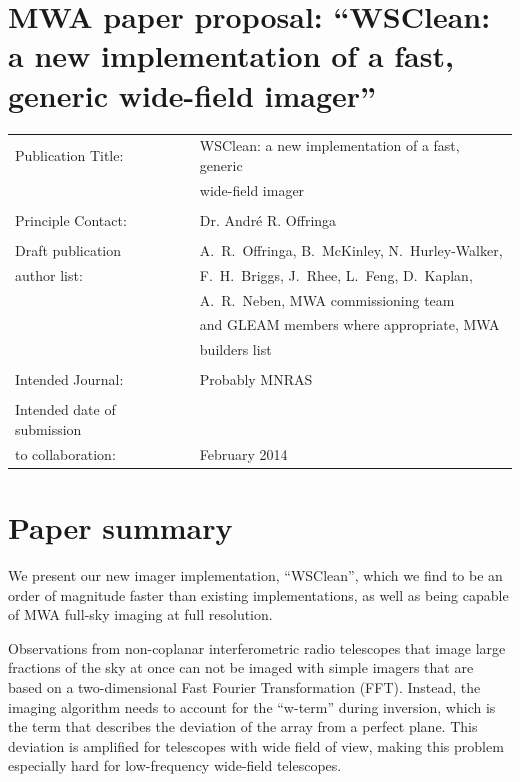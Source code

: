 \documentclass[a4paper,10pt]{article}
\begin{document}
\label{firstpage}
\section*{MWA paper proposal: ``WSClean: a new implementation of a fast, generic wide-field imager''}
\begin{tabular}{ll}
Publication Title: & WSClean: a new implementation of a fast, generic \\
                   & wide-field imager\\
                   & \\
Principle Contact: & Dr. Andr\'e R. Offringa \\
                   & \\
Draft publication        & A.~R.~Offringa, B.~McKinley, N.~Hurley-Walker, \\
\hspace{5mm}author list: & F.~H.~Briggs, J.~Rhee, L.~Feng, D.~Kaplan, \\
                         & A.~R.~Neben, MWA commissioning team \\
                         & and GLEAM members where appropriate, MWA \\
                         & builders list \\
                   & \\
Intended Journal: & Probably MNRAS\\
                   & \\
Intended date of submission\\
\hspace{5mm}to collaboration: & February 2014\\
\end{tabular}

\section*{Paper summary}
We present our new imager implementation, ``WSClean'', which we find to be an order of magnitude faster than existing implementations, as well as being capable of MWA full-sky imaging at full resolution.

Observations from non-coplanar interferometric radio telescopes that image large fractions of the sky at once can not be imaged with simple imagers that are based on a two-dimensional Fast Fourier Transformation (FFT). Instead, the imaging algorithm needs to account for the ``w-term'' during inversion, which is the term that describes the deviation of the array from a perfect plane. This deviation is amplified for telescopes with wide field of view, making this problem especially hard for low-frequency wide-field telescopes.
\end{document}
